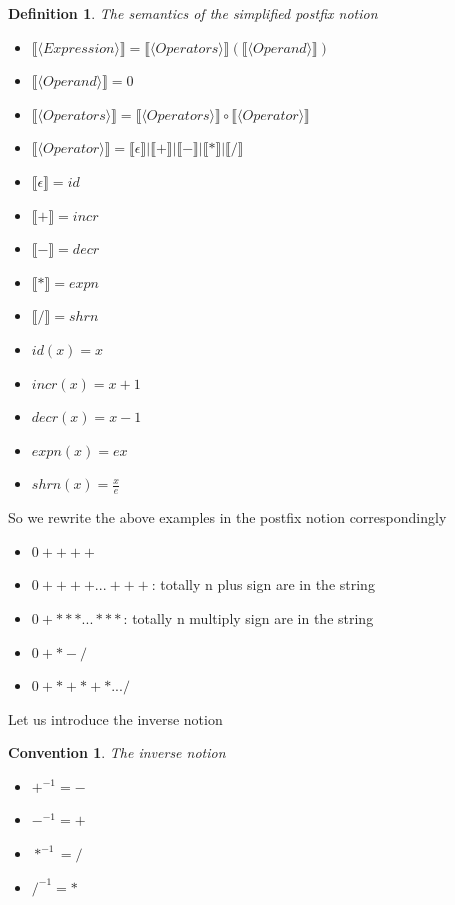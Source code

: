 \documentclass{article}
\newtheorem{definition}{Definition}
\newtheorem{convention}{Convention}
\begin{document}
\begin{definition}
    The semantics of the simplified postfix notion
    \begin{itemize}
    \item $\llbracket\langle Expression \rangle\rrbracket = \llbracket\langle Operators \rangle\rrbracket (\llbracket\langle Operand \rangle\rrbracket)$
    \item $\llbracket\langle Operand \rangle\rrbracket = 0$
    \item $\llbracket\langle Operators \rangle\rrbracket =  \llbracket\langle Operators \rangle\rrbracket \circ \llbracket\langle Operator \rangle\rrbracket$
    \item $\llbracket\langle Operator \rangle\rrbracket = \llbracket\epsilon\rrbracket | \llbracket+\rrbracket | \llbracket-\rrbracket | \llbracket*\rrbracket | \llbracket/\rrbracket$
    \item $\llbracket\epsilon\rrbracket = id$
    \item $\llbracket+\rrbracket = incr$
    \item $\llbracket-\rrbracket = decr$
    \item $\llbracket*\rrbracket = expn$
    \item $\llbracket/\rrbracket = shrn$
    \item $id(x) = x$
    \item $incr(x) = x + 1$
    \item $decr(x) = x - 1$
    \item $expn(x) = e x$
    \item $shrn(x) = \frac{x}{e}$
    \end{itemize}
\end{definition}

So we rewrite the above examples in the postfix notion correspondingly

\begin{itemize}
    \item $0++++$
    \item $0++++...+++$: totally n plus sign are in the string
    \item $0+***...***$: totally n multiply sign are in the string
    \item $0+*-/$
    \item $0+*+*+*.../$
\end{itemize}

Let us introduce the inverse notion

\begin{convention}
    The inverse notion
    \begin{itemize}
        \item $+^{-1} = -$
        \item $-^{-1} = +$
        \item $*^{-1} = /$
        \item $/^{-1} = *$
    \end{itemize}
\end{convention}
\end{document}
